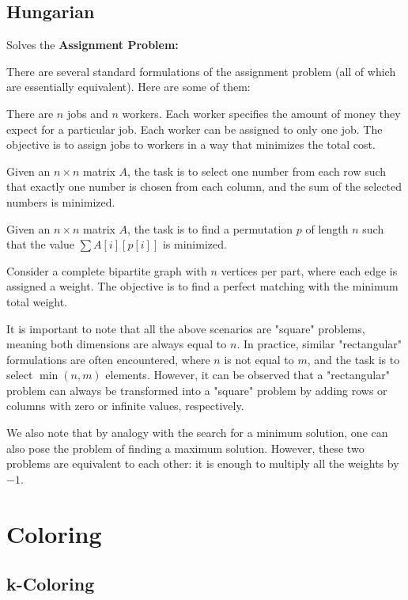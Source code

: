 	\subsection{Hungarian}

		Solves the \textbf{Assignment Problem:}

		There are several standard formulations of the assignment problem (all of which are essentially equivalent). Here are some of them:

		There are $n$ jobs and $n$ workers. Each worker specifies the amount of money they expect for a particular job.
		Each worker can be assigned to only one job. The objective is to assign jobs to workers in a way that minimizes the total cost.

		Given an $n \times n$ matrix $A$, the task is to select one number from each row such that exactly 
		one number is chosen from each column, and the sum of the selected numbers is minimized.

		Given an $n \times n$ matrix $A$, the task is to find a permutation $p$ of length $n$ such that the value
		$\sum A[i]\left[p[i]\right]$ is minimized.

		Consider a complete bipartite graph with $n$ vertices per part, where each edge is assigned a weight.
		The objective is to find a perfect matching with the minimum total weight.

		It is important to note that all the above scenarios are "square" problems, meaning both dimensions are always equal to
		$n$. In practice, similar "rectangular" formulations are often encountered, where $n$ is not equal to 
		$m$, and the task is to select $\min(n,m)$ elements. However, it can be observed that a "rectangular" 
		problem can always be transformed into a "square" problem by adding rows or columns with zero or infinite values, respectively.

		We also note that by analogy with the search for a minimum solution, one can also pose the problem of finding a maximum solution. 
		However, these two problems are equivalent to each other: it is enough to multiply all the weights by $-1$.

	
\section{Coloring}

	\subsection{k-Coloring}

